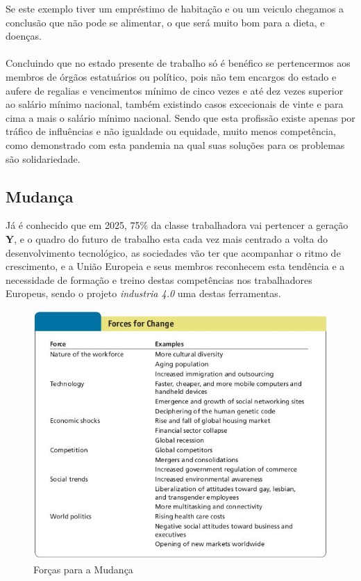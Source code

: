 Se este exemplo tiver um empréstimo de habitação e ou um veiculo chegamos a conclusão que não pode se alimentar, o que será muito bom para a dieta, e doenças.\\
\\
Concluindo que no estado presente de trabalho só é benéfico se pertencermos aos membros de órgãos estatuários ou político, pois não tem encargos do estado e aufere de regalias e vencimentos mínimo de cinco vezes e até dez vezes superior ao salário mínimo nacional, também existindo casos excecionais de vinte e para cima a mais o salário mínimo nacional. Sendo que esta profissão existe apenas por tráfico de influências e não igualdade ou equidade, muito menos competência, como demonstrado com esta pandemia na qual suas soluções para os problemas são solidariedade.
\subsection{Mudança}
\qquad Já é conhecido que em \textsf{2025}, 75\% da classe trabalhadora vai pertencer a geração \textbf{Y}, e o quadro do futuro de trabalho esta cada vez mais centrado a volta do desenvolvimento tecnológico, as sociedades vão ter que acompanhar o ritmo de crescimento, e a União Europeia e seus membros reconhecem esta tendência e a necessidade de formação e treino destas competências nos trabalhadores Europeus, sendo o projeto \textit{industria 4.0} uma destas ferramentas.
\begin{figure}[H]
	\centering
	\includegraphics[scale=0.52]{./image/Change/Forces for Change.jpg}
	\caption{Forças para a Mudança \cite{book_7}}
\end{figure}
